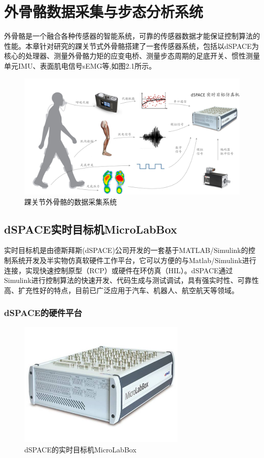 \chapter{外骨骼数据采集与步态分析系统}

外骨骼是一个融合各种传感器的智能系统，可靠的传感器数据才能保证控制算法的性能。本章针对研究的踝关节式外骨骼搭建了一套传感器系统，包括以dSPACE为核心的处理器、测量外骨骼力矩的应变电桥、测量步态周期的足底开关、惯性测量单元IMU、表面肌电信号sEMG等,如图2.1所示。

\begin{figure}[htb]
    \includegraphics[width=15cm]{fig/f27.jpg}
    \caption{踝关节外骨骼的数据采集系统}
    \label{fig:mark}
\end{figure}

\section{dSPACE实时目标机MicroLabBox}

实时目标机是由德斯拜斯(dSPACE)公司开发的一套基于MATLAB/Simulink的控制系统开发及半实物仿真软硬件工作平台，它可以方便的与Matlab/Simulink进行连接，实现快速控制原型（RCP）或硬件在环仿真（HIL）。dSPACE通过Simulink进行控制算法的快速开发、代码生成与测试调试，具有强实时性、可靠性高、扩充性好的特点，目前已广泛应用于汽车、机器人、航空航天等领域。

\subsection{dSPACE的硬件平台}

\begin{figure}[htb]
    \includegraphics[width=8cm]{fig/f21.jpeg}
    \caption{dSPACE的实时目标机MicroLabBox}
    \label{fig:mark}
\end{figure}

